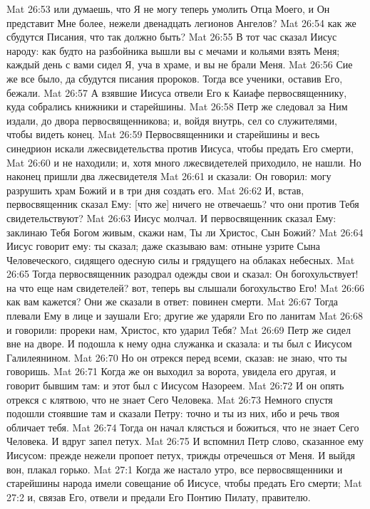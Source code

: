 Mat 26:53  или думаешь, что Я не могу теперь умолить Отца Моего, и Он представит Мне более, нежели двенадцать легионов Ангелов?
Mat 26:54  как же сбудутся Писания, что так должно быть?
Mat 26:55  В тот час сказал Иисус народу: как будто на разбойника вышли вы с мечами и кольями взять Меня; каждый день с вами сидел Я, уча в храме, и вы не брали Меня.
Mat 26:56  Сие же все было, да сбудутся писания пророков. Тогда все ученики, оставив Его, бежали.
Mat 26:57  А взявшие Иисуса отвели Его к Каиафе первосвященнику, куда собрались книжники и старейшины.
Mat 26:58  Петр же следовал за Ним издали, до двора первосвященникова; и, войдя внутрь, сел со служителями, чтобы видеть конец.
Mat 26:59  Первосвященники и старейшины и весь синедрион искали лжесвидетельства против Иисуса, чтобы предать Его смерти,
Mat 26:60  и не находили; и, хотя много лжесвидетелей приходило, не нашли. Но наконец пришли два лжесвидетеля
Mat 26:61  и сказали: Он говорил: могу разрушить храм Божий и в три дня создать его.
Mat 26:62  И, встав, первосвященник сказал Ему: [что же] ничего не отвечаешь? что они против Тебя свидетельствуют?
Mat 26:63  Иисус молчал. И первосвященник сказал Ему: заклинаю Тебя Богом живым, скажи нам, Ты ли Христос, Сын Божий?
Mat 26:64  Иисус говорит ему: ты сказал; даже сказываю вам: отныне узрите Сына Человеческого, сидящего одесную силы и грядущего на облаках небесных.
Mat 26:65  Тогда первосвященник разодрал одежды свои и сказал: Он богохульствует! на что еще нам свидетелей? вот, теперь вы слышали богохульство Его!
Mat 26:66  как вам кажется? Они же сказали в ответ: повинен смерти.
Mat 26:67  Тогда плевали Ему в лице и заушали Его; другие же ударяли Его по ланитам
Mat 26:68  и говорили: прореки нам, Христос, кто ударил Тебя?
Mat 26:69  Петр же сидел вне на дворе. И подошла к нему одна служанка и сказала: и ты был с Иисусом Галилеянином.
Mat 26:70  Но он отрекся перед всеми, сказав: не знаю, что ты говоришь.
Mat 26:71  Когда же он выходил за ворота, увидела его другая, и говорит бывшим там: и этот был с Иисусом Назореем.
Mat 26:72  И он опять отрекся с клятвою, что не знает Сего Человека.
Mat 26:73  Немного спустя подошли стоявшие там и сказали Петру: точно и ты из них, ибо и речь твоя обличает тебя.
Mat 26:74  Тогда он начал клясться и божиться, что не знает Сего Человека. И вдруг запел петух.
Mat 26:75  И вспомнил Петр слово, сказанное ему Иисусом: прежде нежели пропоет петух, трижды отречешься от Меня. И выйдя вон, плакал горько.
Mat 27:1  Когда же настало утро, все первосвященники и старейшины народа имели совещание об Иисусе, чтобы предать Его смерти;
Mat 27:2  и, связав Его, отвели и предали Его Понтию Пилату, правителю.
